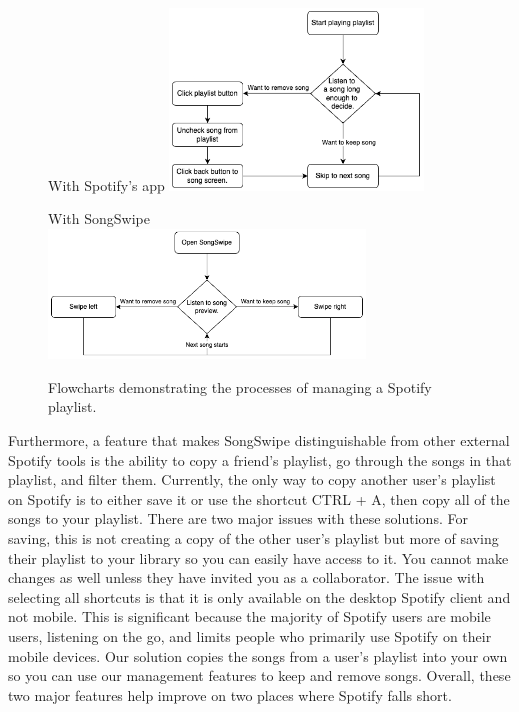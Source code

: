 \documentclass{article}
\begin{document}

\begin{figure}[h]
    \centering
    \begin{subcaptionbox}{With Spotify's app\label{fig:diagram1}}
        {\includegraphics[width=0.60\textwidth]{./flow1.png}}
    \end{subcaptionbox}
    \hspace{1em} %
    \begin{subcaptionbox}{With SongSwipe\label{fig:diagram2}}
        {\includegraphics[width=0.75\textwidth]{./flow2.png}}
    \end{subcaptionbox}
    \caption{Flowcharts demonstrating the processes of managing a Spotify playlist.}
    \label{fig:both_diagrams}
\end{figure}

\quad Furthermore, a feature that makes SongSwipe distinguishable from other external Spotify tools is the ability to copy a friend’s playlist, go through the songs in that playlist, and filter them. Currently, the only way to copy another user’s playlist on Spotify is to either save it or use the shortcut CTRL + A, then copy all of the songs to your playlist. There are two major issues with these solutions. For saving, this is not creating a copy of the other user’s playlist but more of saving their playlist to your library so you can easily have access to it. You cannot make changes as well unless they have invited you as a collaborator. The issue with selecting all shortcuts is that it is only available on the desktop Spotify client and not mobile. This is significant because the majority of Spotify users are mobile users, listening on the go, and limits people who primarily use Spotify on their mobile devices. Our solution copies the songs from a user’s playlist into your own so you can use our management features to keep and remove songs. Overall, these two major features help improve on two places where Spotify falls short.
\end{document}
